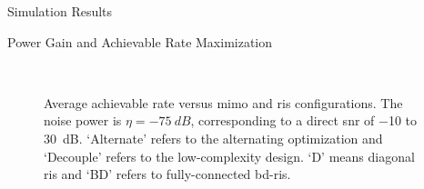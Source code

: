 \documentclass[journal]{IEEEtran}
\begin{document}
\begin{section}{Simulation Results}
\begin{subsection}{Power Gain and Achievable Rate Maximization}
		\begin{figure}[!t]
			\centering
			\\
			\caption{
				Average achievable rate versus \gls{mimo} and \gls{ris} configurations.
				The noise power is $\eta = \qty{-75}{dB}$, corresponding to a direct \gls{snr} of \num{-10} to \qty{30}{dB}.
				`Alternate' refers to the alternating optimization and `Decouple' refers to the low-complexity design.
				`D' means diagonal \gls{ris} and `BD' refers to fully-connected \gls{bd}-\gls{ris}.
			}
			\label{fg:rate}
		\end{figure}


\end{subsection}
\end{section}
\end{document}
